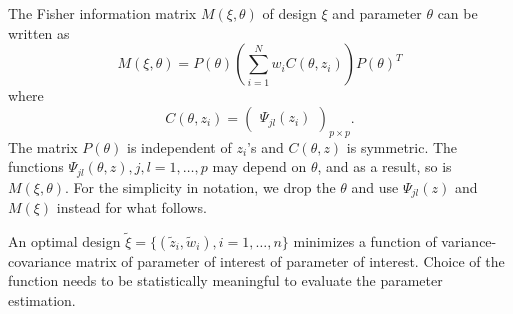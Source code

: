 \documentclass[12pt]{TD-CJS}
\newcommand{\argmin}{\operatornamewithlimits{argmin}}
\begin{document}
The Fisher information matrix $M(\xi,\theta)$ of design $\xi$ and parameter $\theta$ can be written as 
\begin{equation}\label{eq:1}
M(\xi,\theta)  = P(\theta)(\sum_{i=1}^Nw_iC(\theta,z_i))P(\theta)^T
\end{equation}where \begin{equation}\label{eq:2}
C(\theta,z_i) = \left ( \begin{array}{c}
\Psi_{jl}(z_i)
\end{array} \right)_{p\times p}.\end{equation}
The matrix $P(\theta)$ is independent of $z_i$'s and $C(\theta,z)$ is symmetric. The functions $\Psi_{jl}(\theta,z), j,l=1,\ldots,p$ may depend on $\theta$, and as a result, so is $M(\xi,\theta)$. For the simplicity in notation, we drop the $\theta$ and use $\Psi_{jl}(z)$ and $M(\xi)$ instead for what follows. 

An optimal design $\tilde{\xi} = \{(\tilde{z}_i,\tilde{w}_i), i=1,\ldots,n\}$ minimizes a function of variance-covariance matrix of parameter of interest of parameter of interest. Choice of the function needs to be statistically meaningful to evaluate the parameter estimation. 
\end{document}

